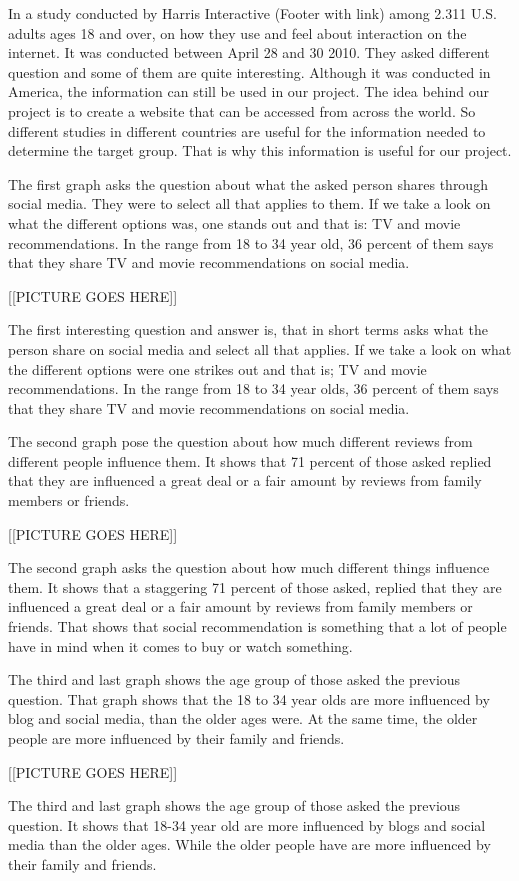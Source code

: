 In a study conducted by Harris Interactive (Footer with link) among 2.311 U.S. adults ages 18 and over, on how they use and feel about interaction on the internet. It was conducted between April 28 and 30 2010. They asked different question and some of them are quite interesting.
Although it was conducted in America, the information can still be used in our project. The idea behind our project is to create a website that can be accessed from across the world. So different studies in different countries are useful for the information needed to determine the target group. That is why this information is useful for our project.

The first graph asks the question about what the asked person shares through social media. They were to select all that applies to them. If we take a look on what the different options was, one stands out and that is: TV and movie recommendations. In the range from 18 to 34 year old, 36 percent of them says that they share TV and movie recommendations on social media.

[[PICTURE GOES HERE]]

The first interesting question and answer is, that in short terms asks what the person share on social media and select all that applies. If we take a look on what the different options were one strikes out and that is; TV and movie recommendations. In the range from 18 to 34 year olds, 36 percent of them says that they share TV and movie recommendations on social media.

The second graph pose the question about how much different reviews from different people influence them. It shows that 71 percent of those asked replied that they are influenced a great deal or a fair amount by reviews from family members or friends. 

[[PICTURE GOES HERE]]

The second graph asks the question about how much different things influence them. It shows that a staggering 71 percent of those asked, replied that they are influenced a great deal or a fair amount by reviews from family members or friends. That shows that social recommendation is something that a lot of people have in mind when it comes to buy or watch something.

The third and last graph shows the age group of those asked the previous question. That graph shows that the 18 to 34 year olds are more influenced by blog and social media, than the older ages were. At the same time, the older people are more influenced by their family and friends.

[[PICTURE GOES HERE]]

The third and last graph shows the age group of those asked the previous question. It shows that 18-34 year old are more influenced by blogs and social media than the older ages. While the older people have are more influenced by their family and friends.